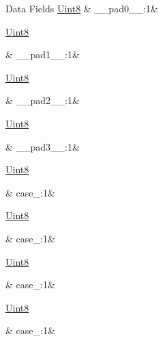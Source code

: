 \begin{DoxyFields}{Data Fields}
\hypertarget{a00022_a74a47a7eac047138ff811ede153943e6}{\hyperlink{a00072_af84840501dec18061d18a68c162a8fa2}{Uint8}}\label{a00022_a74a47a7eac047138ff811ede153943e6}
&
\+\_\+\+\_\+pad0\+\_\+\+\_\+\+:1&
\\
\hline

\hypertarget{a00022_abb67792e94e88254ca5afecf7c26c912}{\hyperlink{a00072_af84840501dec18061d18a68c162a8fa2}{Uint8}}\label{a00022_abb67792e94e88254ca5afecf7c26c912}
&
\+\_\+\+\_\+pad1\+\_\+\+\_\+\+:1&
\\
\hline

\hypertarget{a00022_a2780c6c77e1f937563d98e2f517c2aeb}{\hyperlink{a00072_af84840501dec18061d18a68c162a8fa2}{Uint8}}\label{a00022_a2780c6c77e1f937563d98e2f517c2aeb}
&
\+\_\+\+\_\+pad2\+\_\+\+\_\+\+:1&
\\
\hline

\hypertarget{a00022_ad30f3f7ff6b12f7b97db2c89403b4238}{\hyperlink{a00072_af84840501dec18061d18a68c162a8fa2}{Uint8}}\label{a00022_ad30f3f7ff6b12f7b97db2c89403b4238}
&
\+\_\+\+\_\+pad3\+\_\+\+\_\+\+:1&
\\
\hline

\hypertarget{a00022_a2dc2090faca603cc8979802e609d6fbf}{\hyperlink{a00072_af84840501dec18061d18a68c162a8fa2}{Uint8}}\label{a00022_a2dc2090faca603cc8979802e609d6fbf}
&
case\+\_\+:1&
\\
\hline

\hypertarget{a00022_ae3dbe89a1e307d834912181da872fffd}{\hyperlink{a00072_af84840501dec18061d18a68c162a8fa2}{Uint8}}\label{a00022_ae3dbe89a1e307d834912181da872fffd}
&
case\+\_\+:1&
\\
\hline

\hypertarget{a00022_a4c5c54941d081abd8e54ac2086794458}{\hyperlink{a00072_af84840501dec18061d18a68c162a8fa2}{Uint8}}\label{a00022_a4c5c54941d081abd8e54ac2086794458}
&
case\+\_\+:1&
\\
\hline

\hypertarget{a00022_ad8cf339eb2bcc62ab9c0ca2a295056e0}{\hyperlink{a00072_af84840501dec18061d18a68c162a8fa2}{Uint8}}\label{a00022_ad8cf339eb2bcc62ab9c0ca2a295056e0}
&
case\+\_\+:1&
\\
\hline

\end{DoxyFields}


